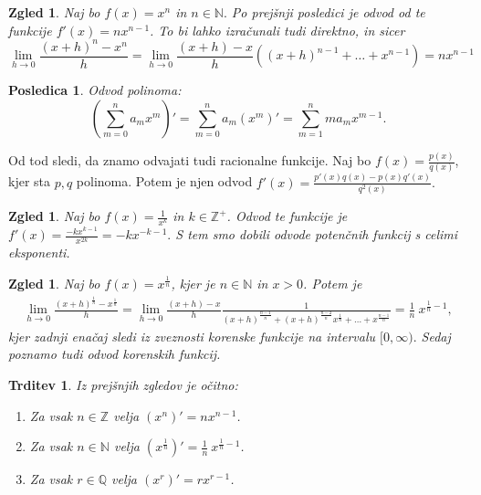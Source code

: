 \documentclass[10pt, a4paper]{article}
\newtheorem{posledica}[izr]{Posledica}
\newtheorem{trditev}[izr]{Trditev}
\newtheorem{zgled}[izr]{Zgled}
\newcommand{\N}{\mathbb {N}}
\newcommand{\Z}{\mathbb {Z}}
\newcommand{\Q}{\mathbb {Q}}
\newcommand{\limf}[3]{\lim_{#1 \to #2} {#3}}
\begin{document}
\begin{zgled}
    Naj bo $f(x) = x^n$ in $n \in \N.$ Po prejšnji posledici je odvod od te funkcije $f'(x) = n x^{n-1}$.
    To bi lahko izračunali tudi direktno, in sicer 
    $$\limf{h}{0}{\frac{(x+h)^n - x^n}{h}} = \limf{h}{0}{\frac{(x+h) - x}{h}} ((x+h)^{n-1} + \dots + x^{n-1}) = nx^{n-1}$$
\end{zgled}

\begin{posledica}
    Odvod polinoma:
    $$\left(\sum_{m = 0} ^n a_m x^m \right)' = \sum_{m = 0} ^n a_m (x^m)' = \sum_{m=1} ^n m a_m x^{m-1}.$$
\end{posledica}
Od tod sledi, da znamo odvajati tudi racionalne funkcije. 
Naj bo $f(x) = \frac{p(x)}{q(x)}$, kjer sta $p,q$ polinoma. Potem je njen odvod
$f'(x) = \frac{p'(x)q(x) - p(x)q'(x)}{q^2(x)}.$

\begin{zgled}
    Naj bo $f(x) = {\frac{1}{x^k}}$ in $k \in \Z^+$. 
    Odvod te funkcije je $f'(x) = \frac{-kx^{k-1}}{x^{2k}} = -kx^{-k-1}.$
    S tem smo dobili odvode potenčnih funkcij s celimi eksponenti.
\end{zgled}
\begin{zgled}
    Naj bo $f(x) = x^{\frac{1}{n}}$, kjer je $n \in \N$ in $x > 0$. Potem je 
    \begin{align*}
        \limf{h}{0}{\frac{(x+h)^{\frac{1}{n}} - x^{\frac{1}{n}}}{h}} 
        = \limf{h}{0}{\frac{(x+h) - x}{h} \frac{1}{(x+h)^{\frac{n-1}{n}} + (x+h)^{\frac{n-2}{n}} x^{\frac{1}{n}} + \dots + x^{\frac{n-1}{n}}}}
        = \frac{1}{n}\ x^{\frac{1}{n} -1},
    \end{align*}
    kjer zadnji enačaj sledi iz zveznosti korenske funkcije na intervalu $[0, \infty).$ Sedaj poznamo tudi odvod korenskih funkcij.
\end{zgled}

\begin{trditev}
    Iz prejšnjih zgledov je očitno:
    \begin{enumerate}
        \item Za vsak $n \in \Z$ velja $(x^n)' = nx^{n-1}$.
        \item Za vsak $n \in \N$ velja $(x^{\frac{1}{n}})' = \frac{1}{n}\ x^{\frac{1}{n} - 1}$.
        \item Za vsak $r \in \Q$ velja $(x^r)' = rx^{r-1}$.
    \end{enumerate}   
\end{trditev}
\end{document}
